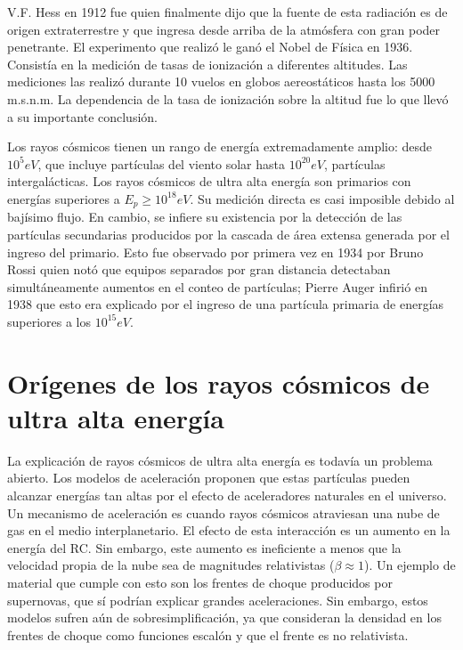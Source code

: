 \documentclass{book}
\begin{document}
V.F. Hess en 1912 fue quien finalmente dijo que la fuente de esta radiaci\'on es de origen extraterrestre y que ingresa desde arriba de la atm\'osfera con gran poder penetrante. El experimento que realiz\'o le gan\'o el Nobel de F\'isica en 1936. Consist\'ia en la medici\'on de tasas de ionizaci\'on a diferentes altitudes. Las mediciones las realiz\'o durante 10 vuelos en globos aereost\'aticos hasta los 5000 m.s.n.m. La dependencia de la tasa de ionizaci\'on sobre la altitud fue lo que llev\'o a su importante conclusi\'on. \citep{ASOREY}

Los rayos c\'osmicos tienen un rango de energ\'ia extremadamente amplio: desde $10^5 eV$, que incluye part\'iculas del viento solar hasta $10^{20} eV$, part\'iculas intergal\'acticas. Los rayos c\'osmicos de ultra alta energ\'ia son primarios con energ\'ias superiores a $E_p \geq 10^{18} eV$. Su medici\'on directa es casi imposible debido al baj\'isimo flujo. En cambio, se infiere su existencia por la detecci\'on de las part\'iculas secundarias producidos por la cascada de \'area extensa generada por el ingreso del primario. Esto fue observado por primera vez en 1934 por Bruno Rossi quien not\'o que equipos separados por gran distancia detectaban simult\'aneamente aumentos en el conteo de part\'iculas; Pierre Auger infiri\'o en 1938 que esto era explicado por el ingreso de una part\'icula primaria de energ\'ias superiores a los $10^{15}eV$. \citep{ASOREY}

\section{Or\'igenes de los rayos c\'osmicos de ultra alta energ\'ia}

La explicaci\'on de rayos c\'osmicos de ultra alta energ\'ia es todav\'ia un problema abierto. Los modelos de aceleraci\'on proponen que estas part\'iculas pueden alcanzar energ\'ias tan altas por el efecto de aceleradores naturales en el universo. Un mecanismo de aceleraci\'on es cuando rayos c\'osmicos atraviesan una nube de gas en el medio interplanetario. El efecto de esta interacci\'on es un aumento en la energ\'ia del RC. Sin embargo, este aumento es ineficiente a menos que la velocidad propia de la nube sea de magnitudes relativistas ($\beta\approx1$). Un ejemplo de material que cumple con esto son los frentes de choque producidos por supernovas, que s\'i podr\'ian explicar grandes aceleraciones. Sin embargo, estos modelos sufren a\'un de sobresimplificaci\'on, ya que consideran la densidad en los frentes de choque como funciones escal\'on y que el frente es no relativista.\citep{ASOREY}
\end{document}
